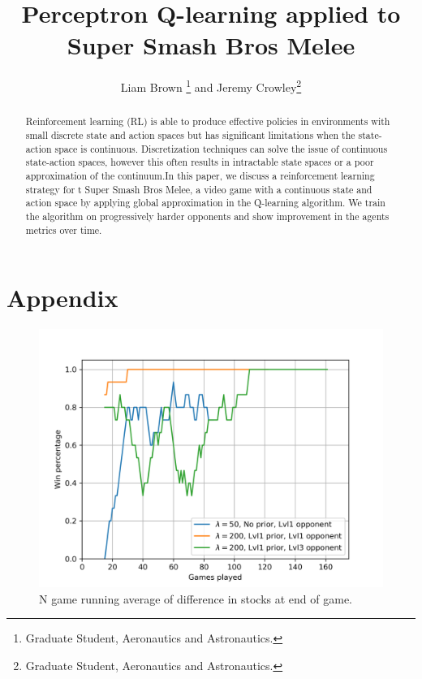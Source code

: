 \documentclass[journal]{new-aiaa}
\title{Perceptron Q-learning applied to Super Smash Bros Melee}
\author{Liam Brown \footnote{Graduate Student, Aeronautics and Astronautics.} and Jeremy Crowley\footnote{Graduate Student, Aeronautics and Astronautics.}}
\affil{Stanford University, Stanford, CA, 94305}
\begin{document}
\maketitle

\begin{abstract}
Reinforcement learning (RL) is able to produce effective policies in environments with small discrete state and action spaces but has significant limitations when the state-action space is continuous. Discretization techniques can solve the issue of continuous state-action spaces, however this often results in intractable state spaces or a poor approximation of the continuum.In this paper, we discuss a reinforcement learning strategy for t Super Smash Bros Melee, a video game with a continuous state and action space by applying global approximation in the Q-learning algorithm. We train the algorithm on progressively harder opponents and show improvement in the agents metrics over time.

\end{abstract}


%
%



%
%



%
%



%
%



%
%



%
%



%
%
\section*{Appendix}

\begin{figure}[!htb]
\centering
	\includegraphics[width=120mm]{winpctg.png}
	\caption{N game running average of difference in stocks at end of game. \label{winpctg}}
\end{figure}
\end{document}

